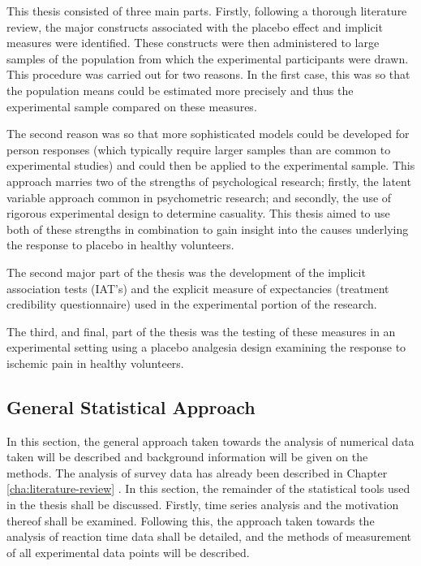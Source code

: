 This thesis consisted of three main parts. Firstly, following a thorough literature review, the major constructs associated with the placebo effect and implicit measures were identified. These constructs were then administered to large samples of the population from which the experimental participants were drawn. This procedure was carried out for two reasons. In the first case, this was so that the population means could be estimated more precisely and thus the experimental sample compared on these measures.  

The second reason was so that more sophisticated models could be developed for person responses (which typically require larger samples than are common to experimental studies) and could then be applied to the experimental sample. This approach marries two of the strengths of psychological research; firstly, the latent variable approach common in psychometric research; and secondly, the use of rigorous experimental design to determine casuality. This thesis aimed to use both of these strengths in combination to gain insight into the causes underlying the response to placebo in healthy volunteers.

The second major part of the thesis was the development of the implicit association tests (IAT's) and the explicit measure of expectancies (treatment credibility questionnaire) used in the experimental portion of the research. 

The third, and final, part of the thesis was the testing of these measures in an experimental setting using a placebo analgesia design examining the response to ischemic pain in healthy volunteers. 

\subsection{General Statistical Approach}

In this section, the general approach taken towards the analysis of numerical data taken will be described and background information will be given on the methods.
The analysis of survey data has already been described in Chapter \ref{cha:literature-review} . In this section, the remainder of the statistical tools used in the thesis shall be discussed.  Firstly, time series analysis and the motivation thereof shall be examined.   Following this, the approach taken towards the analysis of reaction time data shall be detailed, and the methods of measurement of all experimental data points will be described.


